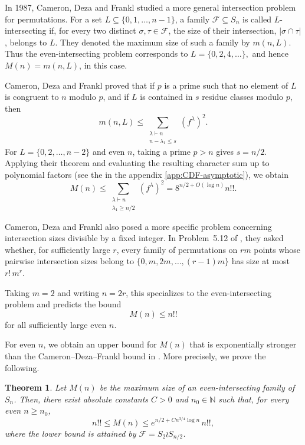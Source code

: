 \documentclass[12pt]{article}
\newtheorem{theorem}{Theorem}
\theoremstyle{definition}
\newcommand{\1}{\mathbf 1}
\begin{document}
In 1987, Cameron, Deza and Frankl \cite{cameron1987sharp} studied a more general intersection
problem for permutations. For a set
$L\subseteq\{0,1,\ldots,n-1\}$, a family $\mathcal{F}\subseteq S_n$ is called
$L$-intersecting if, for every two distinct $\sigma,\tau\in\mathcal{F}$, the
size of their intersection, $|\sigma\cap \tau|$, belongs to $L$. They
denoted the maximum size of such a family by $m(n,L)$. Thus 
the even-intersecting problem corresponds to $
L=\{0, 2, 4,\ldots\},
$ and hence $M(n)=m(n,L)$, in this case.


 Cameron, Deza and Frankl  \cite{cameron1987sharp} proved that if $p$ is a prime such that no
element of $L$ is congruent to $n$ modulo $p$, and if $L$ is contained in $s$
residue classes modulo $p$, then
$$
m(n,L)
\leq
\sum_{\substack{\lambda\vdash n\\ n-\lambda_1\leq s}}
(f^\lambda)^2.
$$
For $L=\{0,2,\ldots,n-2\}$ and even $n$, taking a prime
$p>n$ gives $s=n/2$. Applying their theorem and evaluating
the resulting character sum up to polynomial factors (see the  in the appendix \ref{app:CDF-asymptotic}), we obtain
\begin{equation}
M(n)
\leq
\sum_{\substack{\lambda\vdash n\\ \lambda_1\geq n/2}}
(f^\lambda)^2= 8^{{n}/{2}+O(\log n)}n!!.
\label{eq:CDF-even-bound}
\end{equation}


Cameron, Deza and Frankl also posed a more specific problem concerning
intersection sizes divisible by a fixed integer. In
Problem~5.12 of \cite{cameron1987sharp}, they asked whether, for sufficiently large
$r$, every family of permutations on $rm$ points whose pairwise intersection
sizes belong to $
\{0,m,2m,\ldots,(r-1)m\}
$ has size at most $r!\,m^r.$

Taking $m=2$ and writing $n=2r$, this specializes to the even-intersecting
problem and predicts the bound
$$
M(n)\leq n!!
$$
for all sufficiently large even $n$. 

For even $n$, we obtain an upper bound for $M(n)$ that is exponentially stronger than the Cameron--Deza--Frankl bound in . More precisely, we prove the following.


\begin{theorem}\label{thm:main_result}
Let $M(n)$ be the maximum size of an even-intersecting family of $S_n$.
    Then, there exist absolute constants
$C>0$ and $n_0 \in \mathbb{N}$ such that, for every even $n\geq n_0$,
\begin{equation*}
n!!\leq M(n)
\leq e^{{n}/{2}+C n^{3/4}\log n}\,n!!,
\label{eq:main-even-intro}
\end{equation*}
where the lower bound is attained by $\mathcal{F}=S_2\wr S_{n/2}$.
\end{theorem}
\end{document}
